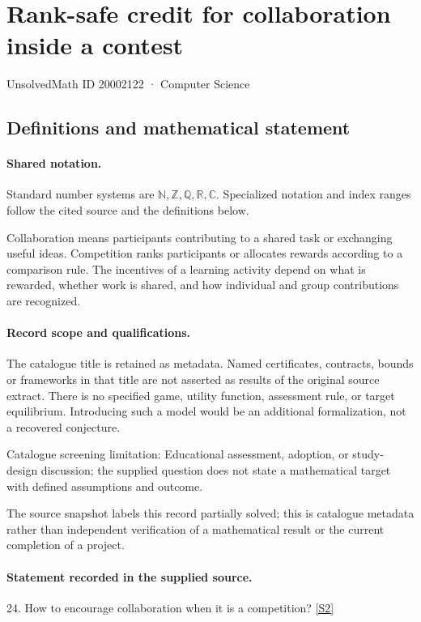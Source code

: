 \documentclass[11pt]{article}
\newcommand{\sref}[2]{\hyperlink{source:#1:#2}{[S#2]}}
\begin{document}
\setcounter{section}{20002121}
\section{Rank-safe credit for collaboration inside a contest}\label{20002122}
{\small\sffamily UnsolvedMath ID 20002122 · Computer Science}
\subsection{Definitions and mathematical statement}

\paragraph{Shared notation.}Standard number systems are $\mathbb N,\mathbb Z,\mathbb Q,\mathbb R,\mathbb C$. Specialized notation and index ranges follow the cited source and the definitions below.


Collaboration means participants contributing to a shared task or exchanging useful ideas. Competition ranks participants or allocates rewards according to a comparison rule. The incentives of a learning activity depend on what is rewarded, whether work is shared, and how individual and group contributions are recognized.
\paragraph{Record scope and qualifications.}
The catalogue title is retained as metadata. Named certificates, contracts, bounds or frameworks in that title are not asserted as results of the original source extract.
There is no specified game, utility function, assessment rule, or target equilibrium. Introducing such a model would be an additional formalization, not a recovered conjecture.

Catalogue screening limitation: Educational assessment, adoption, or study-design discussion; the supplied question does not state a mathematical target with defined assumptions and outcome.

The source snapshot labels this record partially solved; this is catalogue metadata rather than independent verification of a mathematical result or the current completion of a project.
\paragraph{Statement recorded in the supplied source.}
24. How to encourage collaboration when it is a competition? \sref{20002122}{2}
\end{document}
